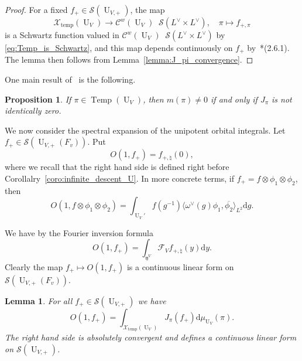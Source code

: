 \documentclass[letterpaper,11pt]{amsart}
\newcommand{\fy}{\mathfrak{y}}
\newcommand{\cC}{\mathcal{C}}
\newcommand{\cF}{\mathcal{F}}
\newcommand{\cS}{\mathcal{S}}
\newcommand{\cX}{\mathcal{X}}
\newcommand{\rd}{\mathrm{d}}
\newcommand{\<}{\negthickspace}
\DeclareMathOperator{\U}{U}
\DeclareMathOperator{\Temp}{Temp} \DeclareMathOperator{\temp}{temp}
\DeclareMathOperator{\otimeshat}{\widehat{\otimes}}
\theoremstyle{definition}
\theoremstyle{plain}
\newtheorem{prop}[definition]{Proposition}
\newtheorem{lemma}[definition]{Lemma}
\theoremstyle{remark}
\numberwithin{equation}{section}
\begin{document}
\begin{proof}
For a fixed $f_+ \in \cS(\U_{V, +})$, the map
    \[
    \cX_{\temp}(\U_V)  \to \cC^w(\U_V) \otimeshat \cS(L^\vee \times L^\vee), \quad
    \pi \mapsto f_{+, \pi}
    \]
is a Schwartz function valued in $\cC^w(\U_V) \otimeshat \cS(L^\vee \times L^\vee)$ by
\eqref{eq:Temp_is_Schwartz}, and this map depends continuously on $f_+$
by~\cite{BP1}*{(2.6.1)}. The lemma then follows from
Lemma~\ref{lemma:J_pi_convergence}.
\end{proof}


One main result of~\cite{Xue6} is the following.

\begin{prop}    \label{prop:explicit_intertwining}
If $\pi \in \Temp(\U_V)$, then $m(\pi) \not=0$ if and only if $J_{\pi}$ is
not identically zero.
\end{prop}


We now consider the spectral expansion of the unipotent orbital integrals. Let $f_+ \in \cS(\U_{V, +}(F_v))$. Put
    \[
    O(1, f_+) =  f_{+, \natural}(0),
    \]
where we recall that the right hand side is defined right before Corollalry~\ref{coro:infinite_descent_U}. In more concrete terms, if $f_+ = f \otimes \phi_1 \otimes \phi_2$, then
    \[
    O(1, f \otimes \phi_1 \otimes \phi_2) = \int_{\U_V'} f(g^{-1})
    \langle \omega^\vee(g) \phi_1, \overline{\phi_2} \rangle_{L^2} \rd g.
    \]

We have by the Fourier inversion formula
    \begin{equation}    \label{eq:spectral_nilpotent_u}
    O(1, f_+) = \int_{\fy^{V}} \cF_{V}
    f_{+, \natural} (y) \rd y.
    \end{equation}
Clearly the map $f_+ \mapsto O(1, f_+)$ is a continuous linear form on
$\cS(\U_{V, +}(F_v))$.


\begin{lemma}   \label{lemma:plancherel_U}
For all $f_+ \in \cS(\U_{V, +})$ we have
    \begin{equation}    \label{eq:plancherel_U}
    O(1, f_+) = \int_{\cX_{\temp}(\U_V)}
    J_{\pi}(f_+) \rd \mu_{\U_V}(\pi).
    \end{equation}
The right hand side is absolutely convergent and defines a continuous linear
form on $\cS(\U_{V, +})$.
\end{lemma}
\end{document}
